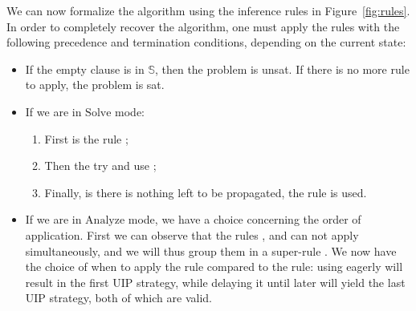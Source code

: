 \documentclass{article}
\begin{document}
We can now formalize the \sat{} algorithm using the inference rules
in Figure~\ref{fig:rules}. In order to completely recover the \sat{} algorithm,
one must apply the rules with the following precedence and termination conditions,
depending on the current state:
\begin{itemize}
  \item If the empty clause is in $\mathbb{S}$, then the problem is unsat.
    If there is no more rule to apply, the problem is sat.
  \item If we are in $\text{Solve}$ mode:
    \begin{enumerate}
      \item First is the rule ;
      \item Then the try and use ;
      \item Finally, is there is nothing left to be propagated, the 
        rule is used.
    \end{enumerate}
  \item If we are in $\text{Analyze}$ mode, we have a choice concerning
    the order of application. First we can observe that the rules
    ,  and 
    can not apply simultaneously, and we will thus group them in a super-rule
    . We now have the choice of when to apply the  rule
    compared to the  rule:
    using  eagerly will result in the first UIP strategy, while delaying it
    until later will yield the last UIP strategy, both of which are valid.
\end{itemize}
\end{document}
